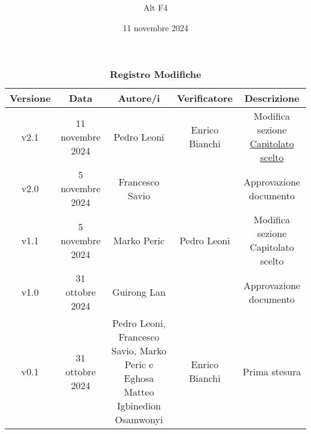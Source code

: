 \documentclass[a4paper, 12pt]{article}
\title{\Huge \textbf{\titolo}}
\author{\Large{Alt} \raisebox{0.3ex}{\normalsize  +} \Large{F4}}
\date{11 novembre 2024}
\def\logo{../Immagini/logo.jpeg}
\def\ultima-versione{v2.1}
\begin{document}
\begin{titlepage}      
    \maketitle
    \thispagestyle{empty}  

\end{titlepage}

\thispagestyle{plain}
\begin{table}[!h]
    \centering
    \caption*{\textbf{\Large Registro Modifiche}}
    {\renewcommand{\arraystretch}{2}
    \begin{tabularx}{\textwidth}{| c | c | C | C | C |}
        \hline
            \textbf{\normalsize Versione} & 
            \textbf{\normalsize Data} & 
            \textbf{\normalsize Autore/i} & 
            \textbf{\normalsize Verificatore} &
            \textbf{\normalsize Descrizione} \\ 
        \hline \hline
        \ultima-versione & 
        11 novembre 2024 & 
        Pedro Leoni &
        Enrico Bianchi& 
        Modifica sezione \hyperref[sec:caps]{Capitolato scelto} \\ 
        \hline
        v2.0 & 
        5 novembre 2024 & 
        Francesco Savio &
        & 
        Approvazione documento \\ 
    \hline 
        v1.1 & 
        5 novembre 2024 & 
        Marko Peric & 
        Pedro Leoni&
        Modifica sezione Capitolato scelto \\ 
        \hline
            v1.0 & 
            31 ottobre 2024 & 
            Guirong Lan &
            & 
            Approvazione documento \\ 
        \hline 
            v0.1 & 
            31 ottobre 2024 & 
            \raggedright Pedro Leoni, Francesco Savio, Marko Peric e Eghosa Matteo Igbinedion Osamwonyi & 
            Enrico Bianchi&
            Prima stesura \\ 
        \hline 
    \end{tabularx}}
\end{table}
\restoregeometry
\end{document}
